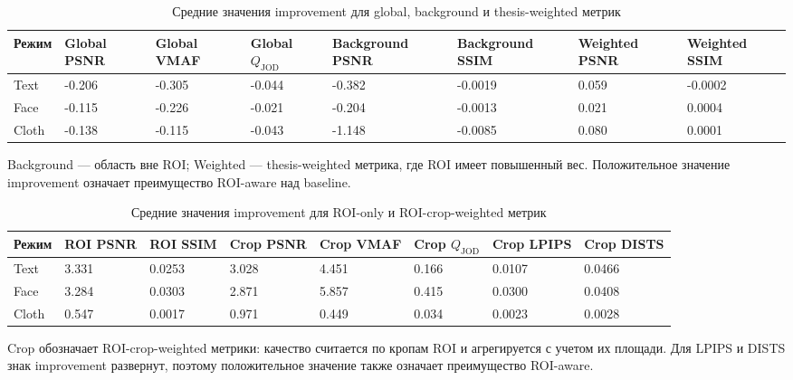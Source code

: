 \documentclass[12pt,a4paper,oneside,openany]{report}
\begin{document}
\begin{table}[H]
  \centering
  \caption{Средние значения improvement для global, background и thesis-weighted метрик}
  \label{tab:roi_global_results}
  \scriptsize
  \begin{tabularx}{\linewidth}{@{}l Z Z Z Z Z Z Z@{}}
    \toprule
    Режим & Global PSNR & Global VMAF & Global $Q_{\mathrm{JOD}}$ & Background PSNR & Background SSIM & Weighted PSNR & Weighted SSIM \\
    \midrule
    Text & -0.206 & -0.305 & -0.044 & -0.382 & -0.0019 & 0.059 & -0.0002 \\
    Face & -0.115 & -0.226 & -0.021 & -0.204 & -0.0013 & 0.021 & 0.0004 \\
    Cloth & -0.138 & -0.115 & -0.043 & -1.148 & -0.0085 & 0.080 & 0.0001 \\
    \bottomrule
  \end{tabularx}
  \par\smallskip
  {\footnotesize Background --- область вне ROI; Weighted --- thesis-weighted метрика, где ROI
  имеет повышенный вес. Положительное значение improvement означает преимущество ROI-aware над
  baseline.}
\end{table}

\begin{table}[H]
  \centering
  \caption{Средние значения improvement для ROI-only и ROI-crop-weighted метрик}
  \label{tab:roi_crop_results}
  \scriptsize
  \begin{tabularx}{\linewidth}{@{}l Z Z Z Z Z Z Z@{}}
    \toprule
    Режим & ROI PSNR & ROI SSIM & Crop PSNR & Crop VMAF & Crop $Q_{\mathrm{JOD}}$ & Crop LPIPS & Crop DISTS \\
    \midrule
    Text & 3.331 & 0.0253 & 3.028 & 4.451 & 0.166 & 0.0107 & 0.0466 \\
    Face & 3.284 & 0.0303 & 2.871 & 5.857 & 0.415 & 0.0300 & 0.0408 \\
    Cloth & 0.547 & 0.0017 & 0.971 & 0.449 & 0.034 & 0.0023 & 0.0028 \\
    \bottomrule
  \end{tabularx}
  \par\smallskip
  {\footnotesize Crop обозначает ROI-crop-weighted метрики: качество считается по кропам ROI и
  агрегируется с учетом их площади. Для LPIPS и DISTS знак improvement развернут, поэтому
  положительное значение также означает преимущество ROI-aware.}
\end{table}
\end{document}
